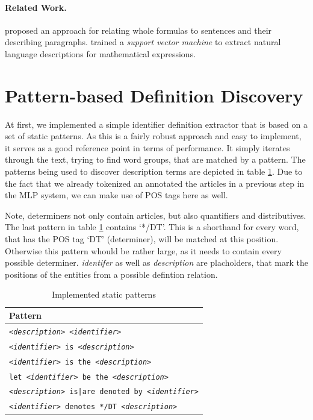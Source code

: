 \documentclass[runningheads]{llncs}
\begin{document}
\paragraph{Related Work.}

\citeauthor{Quoc2010} \cite{Quoc2010} proposed an approach for
relating whole formulas to sentences and their describing paragraphs.
\citeauthor{Yokoi} \cite{Yokoi} trained a \emph{support vector machine} to extract
natural language descriptions for mathematical expressions.

\section{Pattern-based Definition Discovery}

At first, we implemented a simple identifier definition extractor that is
based on a set of static patterns. As this is a fairly robust approach and easy
to implement, it serves as a good reference point in terms of
performance. It simply iterates through the text, trying to find word groups,
that are matched by a pattern. The patterns being used to discover description
terms are depicted in table \ref{tpatterns}. Due to the fact that we already
tokenized an annotated the articles in a previous step in the MLP system, we
can make use of POS tags here as well.

Note, determiners not only contain articles, but also quantifiers and
distributives. The last pattern in table \ref{tpatterns} contains `*/DT'. This
is a shorthand for every word, that has the POS tag `DT' (determiner), will be
matched at this position. Otherwise this pattern whould be rather large, as it
needs to contain every possible determiner. \emph{identifer} as well as
\emph{description} are placholders, that mark the positions of the entities
from a possible defintion relation.

\begin{table}
\vspace{-5pt}
	\begin{center}
		\begin{tabular}{| p{9.3cm} |}
			\hline
			Pattern \\
			\hline
			\texttt{\emph{<description>} \emph{<identifier>}} \\
			\texttt{\emph{<identifier>} is \emph{<description>}} \\
			\texttt{\emph{<identifier>} is the \emph{<description>}} \\
			\texttt{let \emph{<identifier>} be the \emph{<description>}} \\
			\texttt{\emph{<description>} is|are denoted by \emph{<identifier>}} \\
			\texttt{\emph{<identifier>} denotes */DT \emph{<description>}} \\
			\hline
		\end{tabular}
	\end{center}
\caption{\label{tpatterns}Implemented static patterns}
\vspace{-5pt}
\end{table}
\end{document}
